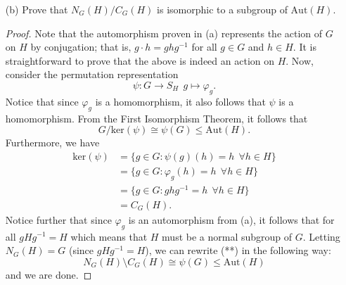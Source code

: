 \documentclass[a4paper]{article}
\begin{document}
\begin{problem}
\begin{enumerate}
\begin{proof}
        (ii) Notice that \( {\varphi}_{g}(H) = gH g^{-1} \). Since \( g \in {N}_{G}(H) \), it follows that \( g H g^{-1} = H  \) and so \( {\varphi}_{g}(H) = H  \). Thus, we get that \( {\varphi}_{g} \) is a bijection from \( H  \) to \( H  \).
        \end{proof}
    \item[(b)] Prove that \( {N}_{G}(H) / {C}_{G}(H) \) is isomorphic to a subgroup of \( \text{Aut}(H)  \).
        \begin{proof}
            Note that the automorphism proven in (a) represents the action of \( G  \) on \( H  \) by conjugation; that is, \( g \cdot h = g h g^{-1} \) for all \( g \in G  \) and \( h \in H  \). It is straightforward to prove that the above is indeed an action on \( H  \). Now, consider the permutation representation \[ \psi:  G \to {S}_{H}  \ \ g \mapsto {\varphi}_{g}. \tag{*} \]
            Notice that since \( {\varphi}_{g} \) is a homomorphism, it also follows that \( \psi  \) is a homomorphism. From the First Isomorphism Theorem, it follows that  
            \[  G / \text{ker}(\psi) \cong \psi(G) \leq \text{Aut}(H). \tag{**}    \]
            Furthermore, we have 
            \begin{align*}
                \text{ker}(\psi)  &= \{ g \in G : \psi(g)(h) = h \ \ \forall h \in H  \}  \\
                                  &= \{ g \in G : {\varphi}_{g}(h) = h \ \ \forall h \in H  \}  \\
                                  &= \{ g \in G : g h g^{-1} = h  \ \ \forall h \in H  \}  \\
                                  &= {C}_{G}(H).
            \end{align*}
            Notice further that since \( {\varphi}_{g} \) is an automorphism from (a), it follows that for all \( g H g^{-1} = H  \) which means that \( H  \) must be a normal subgroup of \( G  \). Letting \( {N}_{G}(H) = G  \) (since \( g H g^{-1} = H  \)), we can rewrite (**) in the following way:
            \[  {N}_{G}(H) \setminus  {C}_{G}(H) \cong \psi(G) \leq \text{Aut}(H) \]
            and we are done.
        \end{proof}
\end{enumerate}
\end{problem}
\end{document}
